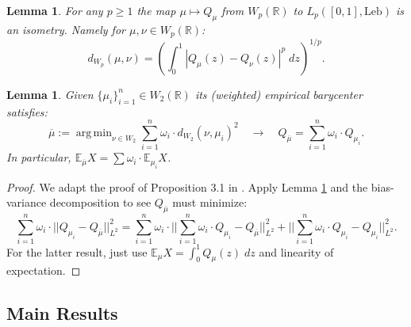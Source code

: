 \documentclass[11pt]{article}
\theoremstyle{plain}
\newtheorem{lemma}[theorem]{Lemma}
\theoremstyle{definition}
\numberwithin{equation}{section}
\newcommand{\R}{\mathbb{R}}
\newcommand{\E}{\mathbb{E}}
\DeclareMathOperator*{\argmin}{arg\,min}
\begin{document}
\begin{lemma}
    For any $p \geq 1$ the map $\mu \mapsto Q_\mu$ from $W_p(\R)$ to $L_p([0,1], \mathrm{Leb})$ is an isometry. Namely for $\mu, \nu \in W_p(\R)$:
    \[d_{W_p}(\mu, \nu) = \left(\int_0^1 |Q_\mu(z) - Q_\nu(z)|^p \; dz \right)^{1/p}.\]
    \label{lem:quantile_fns_are_isometry}
\end{lemma}

\begin{lemma}
    Given $\{\mu_i\}_{i=1}^n \in W_2(\R)$ its (weighted) empirical barycenter satisfies:
    \[\overline{\mu} := \argmin_{\nu \in W_2} \sum_{i=1}^n \omega_i \cdot d_{W_2}(\nu, \mu_i)^2 \quad \to \quad Q_{\overline{\mu}} =  \sum_{i=1}^n \omega_i \cdot Q_{\mu_i}.\]
    \noindent In particular, $\E_{\overline{\mu}} X =  \sum \omega_i \cdot \E_{\mu_i} X$.

    \label{lem:quantile_of_w2_barycenter}
\end{lemma}

\begin{proof}
    We adapt the proof of Proposition 3.1 in \cite{raban2024_aggregate_ratings_wasserstein_barycenters}. Apply Lemma \ref{lem:quantile_fns_are_isometry} and the bias-variance decomposition to see $Q_{\overline{\mu}}$ must minimize:
    \[ \sum_{i=1}^n \omega_i \cdot ||Q_{\mu_i} - Q_{\overline{\mu}}||^2_{L^2} =  \sum_{i=1}^n \omega_i \cdot \bigg|\bigg|  \sum_{i=1}^n \omega_i \cdot Q_{\mu_i} - Q_{\overline{\mu}}\bigg |\bigg|^2_{L^2} +  \bigg|\bigg|  \sum_{i=1}^n \omega_i \cdot Q_{\mu_i} - Q_{\mu_i}\bigg |\bigg|^2_{L^2}.\]
    \noindent For the latter result, just use $\E_\mu X = \int_0^1 Q_\mu(z) \; dz$ and linearity of expectation.
\end{proof}

\subsection{Main Results}
\end{document}
